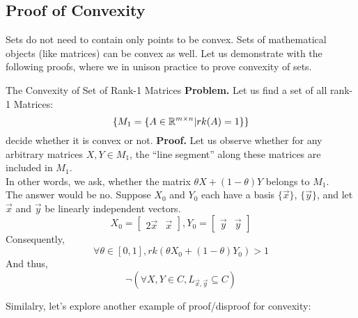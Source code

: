 \subsection{Proof of Convexity}
Sets do not need to contain only points to be convex.
Sets of mathematical objects (like matrices) can be convex as well.
Let us demonstrate with the following proofs, where we in unison practice to prove convexity of sets.
\begin{ln-explain}{The Convexity of Set of Rank-1 Matrices}{}
    \textbf{Problem.} Let us find a set of all rank-1 Matrices:
    \[
        \{M_1 = \{A \in \mathbb{R}^{m \times n} | rk(A) = 1\}\}
    \]
    decide whether it is convex or not.
    \tcblower
    \textbf{Proof.}
    Let us observe whether for any arbitrary matrices $X, Y \in M_1$, the ``line segment'' along these matrices are included in $M_1$. \\
    In other words, we ask, whether the matrix $\theta X + (1 - \theta) Y$ belongs to $M_1$. \\
    The answer would be no. Suppose $X_0$ and $Y_0$ each have a basis $\{\vec{x}\}$, $\{\vec{y}\}$, and let $\vec{x}$ and $\vec{y}$ be linearly independent vectors.
    \[
        X_0 = \begin{bmatrix} 2 \vec{x} & \vec{x} \end{bmatrix},
        Y_0 = \begin{bmatrix} \vec{y} & \vec{y} \end{bmatrix}
    \]
    Consequently,
    \[
        \forall \theta \in [0, 1], rk(\theta X_0 + (1 - \theta) Y_0) > 1
    \]
    And thus,
    \[
        \neg (\forall X, Y \in C, L_{\vec{x}, \vec{y}} \subseteq C)
    \]
\end{ln-explain}
Similalry, let's explore another example of proof/disproof for convexity:
